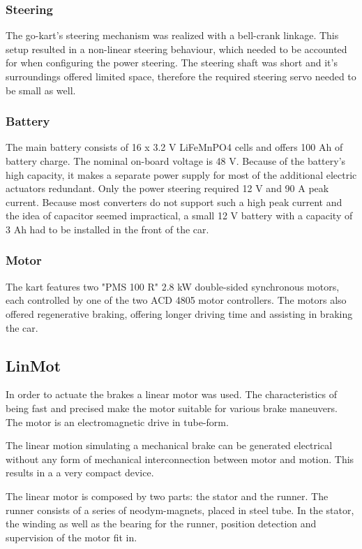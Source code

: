 \subsubsection{Steering}
The go-kart's steering mechanism was realized with a bell-crank linkage. This setup resulted in a non-linear steering behaviour, which needed to be accounted for when configuring the power steering. The steering shaft was short and it's surroundings offered limited space, therefore the required steering servo needed to be small as well.


\subsubsection{Battery}
The main battery consists of 16 x 3.2 V LiFeMnPO4 cells and offers 100 Ah of battery charge. The nominal on-board voltage is 48 V. Because of the battery's high capacity, it makes a separate power supply for most of the additional electric actuators redundant. Only the power steering required 12 V and 90 A peak current. Because most converters do not support such a high peak current and the idea of capacitor seemed impractical, a small 12 V battery with a capacity of 3 Ah had to be installed in the front of the car.

\subsubsection{Motor}
The kart features two "PMS 100 R" 2.8 kW double-sided synchronous motors, each controlled by one of the two ACD 4805 motor controllers. The motors also offered regenerative braking, offering longer driving time and assisting in braking the car.

\subsection{LinMot}
In order to actuate the brakes a linear motor was used. The characteristics of being fast and precised make the motor suitable for various brake maneuvers. The motor is an electromagnetic drive in tube-form. 

The linear motion simulating a mechanical brake can be generated electrical without any form of mechanical interconnection between motor and motion. This results in a a very compact device.

The linear motor is composed by two parts: the stator and the runner.
The runner consists of a series of neodym-magnets, placed in steel tube. In the stator, the winding as well as the bearing for the runner, position detection and supervision of the motor fit in.

